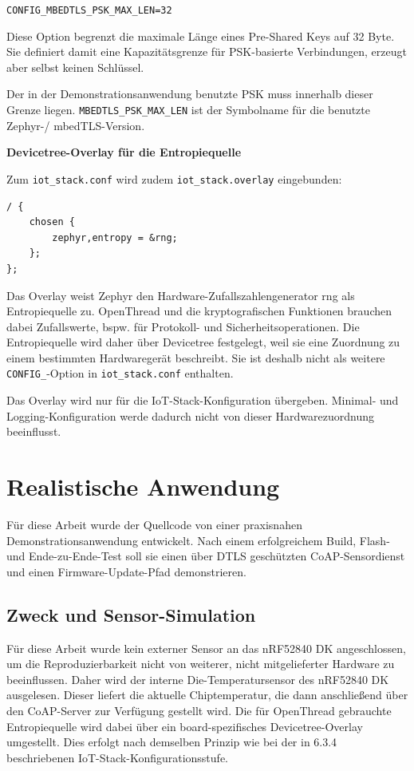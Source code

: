 \lstinline[style=fileinline]|CONFIG_MBEDTLS_PSK_MAX_LEN=32|

Diese Option begrenzt die maximale Länge eines Pre-Shared Keys auf 32 Byte. Sie definiert damit eine Kapazitätsgrenze für PSK-basierte Verbindungen, erzeugt aber selbst keinen Schlüssel.

Der in der Demonstrationsanwendung benutzte PSK muss innerhalb dieser Grenze liegen. \lstinline[style=fileinline]|MBEDTLS_PSK_MAX_LEN| ist der Symbolname für die benutzte Zephyr-/ mbedTLS-Version.

\textbf{Devicetree-Overlay für die Entropiequelle}

Zum \lstinline[style=fileinline]|iot_stack.conf| wird zudem \lstinline[style=fileinline]|iot_stack.overlay| eingebunden:

\begin{lstlisting}[style=basecode,language=DTS]
/ {
    chosen {
        zephyr,entropy = &rng;
    };
};
\end{lstlisting}
Das Overlay weist Zephyr den Hardware-Zufallszahlengenerator rng als Entropiequelle zu. OpenThread und die kryptografischen Funktionen brauchen dabei Zufallswerte, bspw. für Protokoll- und Sicherheitsoperationen. Die Entropiequelle wird daher über Devicetree festgelegt, weil sie eine Zuordnung zu einem bestimmten Hardwaregerät beschreibt. Sie ist deshalb nicht als weitere \lstinline[style=fileinline]|CONFIG_|-Option in \lstinline[style=fileinline]|iot_stack.conf| enthalten.

Das Overlay wird nur für die IoT-Stack-Konfiguration übergeben. Minimal- und Logging-Konfiguration werde dadurch nicht von dieser Hardwarezuordnung beeinflusst.

\section{Realistische Anwendung}
Für diese Arbeit wurde der Quellcode von einer praxisnahen Demonstrationsanwendung entwickelt. Nach einem erfolgreichem Build, Flash- und Ende-zu-Ende-Test soll sie einen über DTLS geschützten CoAP-Sensordienst und einen Firmware-Update-Pfad demonstrieren.

\subsection{Zweck und Sensor-Simulation}
Für diese Arbeit wurde kein externer Sensor an das nRF52840 DK angeschlossen, um die Reproduzierbarkeit nicht von weiterer, nicht mitgelieferter Hardware zu beeinflussen. Daher wird der interne Die-Temperatursensor des nRF52840 DK ausgelesen. Dieser liefert die aktuelle Chiptemperatur, die dann anschließend über den CoAP-Server zur Verfügung gestellt wird. Die für OpenThread gebrauchte Entropiequelle wird dabei über ein board-spezifisches Devicetree-Overlay umgestellt. Dies erfolgt nach demselben Prinzip wie bei der in 6.3.4 beschriebenen IoT-Stack-Konfigurationsstufe.

